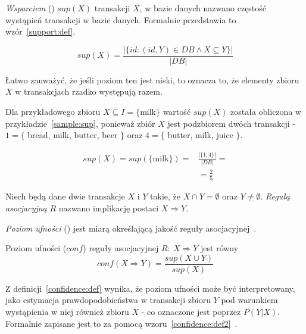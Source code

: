 \emph{Wsparciem} () $sup(X)$ transakcji $X$, w bazie danych nazwano częstość wystąpień transakcji w bazie danych. Formalnie przedstawia to wzór~\ref{support:def}.

\begin{equation}
\label{support:def}
sup(X)=\frac{| \lbrace id: (id,Y)\in DB \wedge X\subseteq Y \rbrace |}{|DB|}
\end{equation}

Łatwo zauważyć, że jeśli poziom ten jest niski, to oznacza to, że elementy zbioru $X$ w transakcjach rzadko występują razem.

Dla przykładowego zbioru $X \subseteq I=\lbrace \textrm{milk} \rbrace$ wartość $sup(X)$ została obliczona w przykładzie~\ref{sample:sup}, ponieważ zbiór $X$ jest podzbiorem dwóch transakcji - $1 = \lbrace$ bread, milk, butter, beer $\rbrace$ oraz $4 = \lbrace$ butter, milk, juice $\rbrace$.

\begin{equation}\label{sample:sup}
\begin{split}
sup(X)= sup(\lbrace \textrm{milk} \rbrace) =& \frac{|\lbrace 1, 4 \rbrace|}{|DB|} =\\
 &= \frac{2}{5}
\end{split}
\end{equation}

\begin{df}\label{regula:def}
Niech będą dane dwie transakcje $X$ i $Y$ takie, że $X\cap Y=\emptyset$ oraz $Y \neq \emptyset$. \emph{Regułą asocjacyjną} $R$ nazwano implikację postaci $X\Rightarrow  Y$.
\end{df}

\emph{Poziom ufności} () jest miarą określającą jakość reguły asocjacyjnej~\cite{Elmasri:db}. 

\begin{df}\label{confidence:def}
Poziom ufności ($conf$) reguły asocjacyjnej $R:\ X \Rightarrow Y$ jest równy 
\begin{equation}
	conf(X \Rightarrow Y) = \frac{sup(X \cup Y)}{sup(X)}
\end{equation}
\end{df}

Z definicji~\ref{confidence:def} wynika, że poziom ufności może być interpretowany, jako estymacja prawdopodobieństwa w transakcji zbioru $Y$ pod warunkiem wystąpienia w niej również zbioru $X$ - co oznaczone jest poprzez $P(Y | X)$. Formalnie zapisane jest to za pomocą wzoru~\ref{confidence:def2}~\cite{ParallelAlgorithms}.

